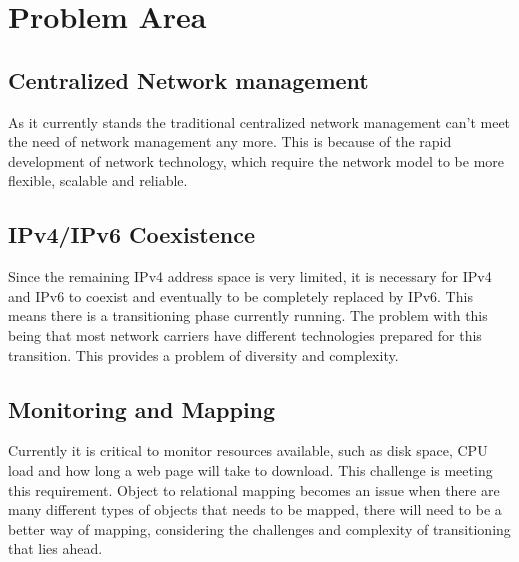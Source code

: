 
%
\section{Problem Area}
   \subsection{Centralized Network management}
\par{
As it currently stands the traditional centralized network management can't meet the need of network management any more. This is because of the rapid development of network technology, which require the network model to be more flexible, scalable and reliable.}\cite{IEEE} 

   \subsection{IPv4/IPv6 Coexistence}
\par{
Since the remaining IPv4 address space is very limited, it is necessary for IPv4 and IPv6 to coexist and eventually to be completely replaced by IPv6. This means there is a transitioning phase currently running. The problem with this being that most network carriers have different technologies prepared for this transition. This provides a problem of diversity and complexity.}
	\subsection{Monitoring and Mapping}\par{
Currently it is critical to monitor resources available, such as disk space, CPU load and how long a web page will take to download. This challenge is meeting this requirement.
	 Object to relational mapping becomes an issue when there are many different types of objects that needs to be mapped, there will need to be a better way of mapping, considering the challenges and complexity of transitioning that lies ahead.}

%